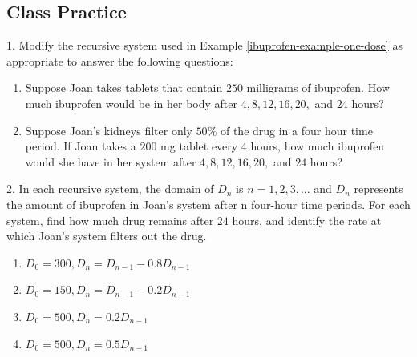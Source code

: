 \documentclass[10pt,]{book}
\theoremstyle{plain}
\theoremstyle{definition}
\theoremstyle{definition}
\theoremstyle{definition}
\numberwithin{equation}{section}
\begin{document}
\subsection[{Class Practice}]{Class Practice}\label{exercises-1}
\begin{exerciselist}
\item[1.]\hypertarget{exercise-1}{}Modify the recursive system used in Example \hyperref[ibuprofen-example-one-dose]{\ref{ibuprofen-example-one-dose}} as appropriate to answer the following questions: \leavevmode%
\begin{enumerate}[label=(\alph*)]
\item\hypertarget{li-1}{}Suppose Joan takes tablets that contain \(250\) milligrams of ibuprofen. How much ibuprofen would be in her body after \(4, 8, 12, 16, 20,\) and \(24\) hours?%
\item\hypertarget{li-2}{}Suppose Joan's kidneys filter only \(50\%\) of the drug in a four hour time period.  If Joan takes a \(200\) mg tablet every \(4\) hours, how much ibuprofen would she have in her system after \(4, 8, 12, 16, 20,\) and \(24\) hours?%
\end{enumerate}
%
\par\smallskip
\item[2.]\hypertarget{exercise-2}{}In each recursive system, the domain of \(D_n\) is \(n=1,2,3, ...\) and \(D_n\) represents the amount of ibuprofen in Joan's system after n four-hour time periods.  For each system, find how much drug remains after \(24\) hours, and identify the rate at which Joan's system filters out the drug. \leavevmode%
\begin{enumerate}[label=(\alph*)]
\item\hypertarget{li-3}{}\(D_0=300, D_n=D_{n-1} - 0.8D_{n-1}\)%
\item\hypertarget{li-4}{}\(D_0=150, D_n=D_{n-1} - 0.2D_{n-1}\)%
\item\hypertarget{li-5}{}\(D_0=500, D_n=0.2D_{n-1}\)%
\item\hypertarget{li-6}{}\(D_0=500, D_n=0.5D_{n-1}\)%
\end{enumerate}
%
\par\smallskip
\end{exerciselist}
\end{document}
